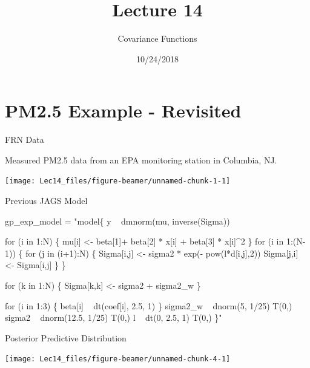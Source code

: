 \documentclass[11pt,ignorenonframetext,]{beamer}
\title{Lecture 14}
\subtitle{Covariance Functions}
\date{10/24/2018}
\newenvironment{Shaded}{}{}
\newcommand{\NormalTok}[1]{#1}
\newcommand{\StringTok}[1]{\textcolor[rgb]{0.25,0.44,0.63}{#1}}
\let\oldShaded\Shaded
\let\endoldShaded\endShaded
\renewenvironment{Shaded}{\footnotesize\begin{spacing}{0.9}\oldShaded}{\endoldShaded\end{spacing}}
\let\oldverbatim\verbatim
\let\endoldverbatim\endverbatim
\newcommand{\scriptoutput}{
  \renewenvironment{Shaded}{\scriptsize\begin{spacing}{0.9}\oldShaded}{\endoldShaded\end{spacing}}
  \renewenvironment{verbatim}{\scriptsize\begin{spacing}{0.9}\oldverbatim}{\endoldverbatim\end{spacing}}
}
\begin{document}
\frame{\titlepage}

\hypertarget{pm2.5-example---revisited}{%
\section{PM2.5 Example - Revisited}\label{pm2.5-example---revisited}}

\begin{frame}{FRN Data}
\protect\hypertarget{frn-data}{}

Measured PM2.5 data from an EPA monitoring station in Columbia, NJ.

\begin{center}\texttt{[image: Lec14\_files/figure-beamer/unnamed-chunk-1-1]} \end{center}

\end{frame}

\begin{frame}[fragile]{Previous JAGS Model}
\protect\hypertarget{previous-jags-model}{}

\scriptoutput

\begin{Shaded}
\begin{Highlighting}[]
\NormalTok{gp_exp_model =}\StringTok{ "model\{}
\StringTok{  y ~ dmnorm(mu, inverse(Sigma))}

\StringTok{  for (i in 1:N) \{}
\StringTok{    mu[i] <- beta[1]+ beta[2] * x[i] + beta[3] * x[i]^2}
\StringTok{  \}}
\StringTok{  }
\StringTok{  for (i in 1:(N-1)) \{}
\StringTok{    for (j in (i+1):N) \{}
\StringTok{      Sigma[i,j] <- sigma2 * exp(- pow(l*d[i,j],2))}
\StringTok{      Sigma[j,i] <- Sigma[i,j]}
\StringTok{    \}}
\StringTok{  \}}

\StringTok{  for (k in 1:N) \{}
\StringTok{    Sigma[k,k] <- sigma2 + sigma2_w}
\StringTok{  \}}

\StringTok{  for (i in 1:3) \{}
\StringTok{    beta[i] ~ dt(coef[i], 2.5, 1)}
\StringTok{  \}}
\StringTok{  sigma2_w ~ dnorm(5, 1/25) T(0,)}
\StringTok{  sigma2   ~ dnorm(12.5, 1/25) T(0,)}
\StringTok{  l        ~ dt(0, 2.5, 1) T(0,) }
\StringTok{\}"}
\end{Highlighting}
\end{Shaded}

\end{frame}

\begin{frame}{Posterior Predictive Distribution}
\protect\hypertarget{posterior-predictive-distribution}{}

\begin{center}\texttt{[image: Lec14\_files/figure-beamer/unnamed-chunk-4-1]} \end{center}

\end{frame}
\end{document}

